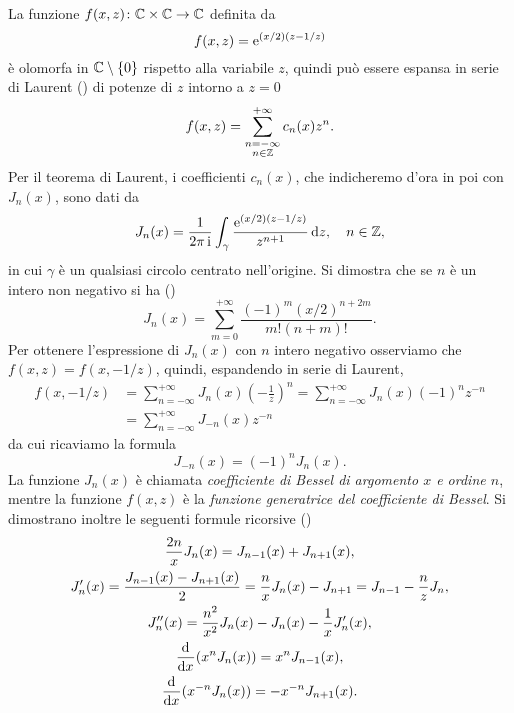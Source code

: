 La funzione $f(x,z)\colon\mathbb{C}\times\mathbb{C}\to\mathbb{C}$ definita da
\begin{equation}
  f(x,z) = \operatorname{\mathrm{e}}^{(x/2)(z - 1/z)}
\end{equation}
è olomorfa in $\mathbb{C}\setminus \{0\}$ rispetto alla variabile $z$, quindi può essere
espansa in serie di Laurent (\textcite[673]{demarco:analisi2}) di potenze di $z$
intorno a $z=0$
\begin{equation}
  f(x,z) = \sum_{\substack{n = -\infty \\ n \in \mathbb{Z}}}^{+\infty} c_n(x) z^n.
\end{equation}
Per il teorema di Laurent, i coefficienti $c_n(x)$, che indicheremo d'ora in poi
con $J_n(x)$, sono dati da
\begin{equation}
  J_n(x) = \frac{1}{2\pi\operatorname{\mathrm{i}}}\int_\gamma \frac{\operatorname{\mathrm{e}}^{(x/2)(z-1/z)}}{z^{n+1}}\mathop{}\!\mathrm{d} z,
  \quad n\in\mathbb{Z},
\end{equation}
in cui $\gamma$ è un qualsiasi circolo centrato nell'origine. Si dimostra che se
$n$ è un intero non negativo si ha (\textcite[355]{whittaker:modern-analysis})
\begin{equation}
  J_n (x) = \sum_{m = 0}^{+\infty}\frac{(-1)^m(x/2)^{n+2m}}{m!(n+m)!}.
\end{equation}
Per ottenere l'espressione di $J_n(x)$ con $n$ intero negativo osserviamo che
$f(x,z) = f(x,-1/z)$, quindi, espandendo in serie di Laurent,
\begin{equation}
  \begin{split}
    f(x,-1/z) &= \sum_{n = -\infty}^{+\infty}J_n(x)
    \left(
      -\frac{1}{z}
    \right)^n = \sum_{n = -\infty}^{+\infty}J_n(x)(-1)^nz^{-n} \\
    &= \sum_{n = -\infty}^{+\infty}J_{-n}(x)z^{-n}
  \end{split}
\end{equation}
da cui ricaviamo la formula
\begin{equation}
  J_{-n}(x) = (-1)^nJ_n(x).
\end{equation}
La funzione $J_n(x)$ è chiamata \emph{coefficiente di Bessel di argomento $x$ e
  ordine $n$}, mentre la funzione $f(x,z)$ è la \emph{funzione generatrice del
  coefficiente di Bessel}. Si dimostrano inoltre le seguenti formule ricorsive
(\textcites[17]{watson:bessel}[359]{whittaker:modern-analysis})
\begin{subequations}
  \begin{gather}
    \frac{2n}{x} J_n(x) = J_{n-1}(x) + J_{n+1}(x),\\
    J_n'(x) = \frac{J_{n-1}(x) - J_{n+1}(x)}{2} = \frac{n}{x}J_n(x) - J_{n+1} =
    J_{n-1} - \frac{n}{z}J_n,\\
    J_n''(x) = \frac{n^2}{x^2}J_n(x) - J_n(x) - \frac{1}{x}J_n'(x),\\
    \frac{{\mathop{}\!\mathrm{d}^{}}}{\mathop{}\!\mathrm{d} {x}^{}}(x^nJ_n(x)) = x^nJ_{n-1}(x),\\
    \frac{{\mathop{}\!\mathrm{d}^{}}}{\mathop{}\!\mathrm{d} {x}^{}}(x^{-n}J_n(x)) = -x^{-n}J_{n+1}(x).
  \end{gather}
\end{subequations}
